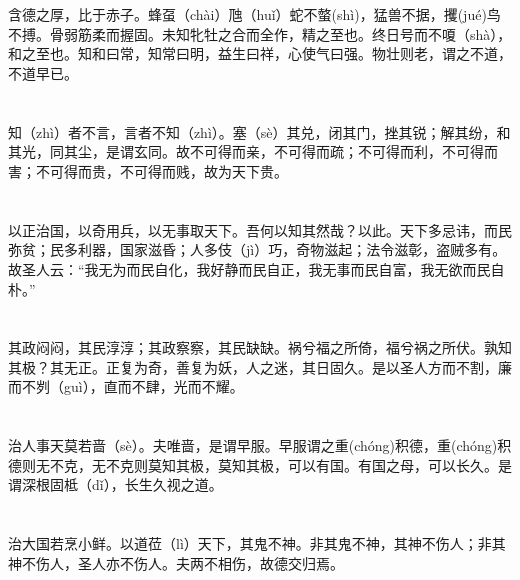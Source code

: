 \documentclass[a4paper,12pt,UTF8,twoside]{ctexbook}
\begin{document}
	\chapter{}	
	
	含德之厚，比于赤子。蜂虿（chài）虺（huǐ）蛇不螫(shì)，猛兽不据，攫(jué)鸟不搏。骨弱筋柔而握固。未知牝牡之合而全作，精之至也。终日号而不嗄（shà），和之至也。知和曰常，知常曰明，益生曰祥，心使气曰强。物壮则老，谓之不道，不道早已。 
	
	\chapter{}	
	
	知（zhì）者不言，言者不知（zhì）。塞（sè）其兑，闭其门，挫其锐；解其纷，和其光，同其尘，是谓玄同。故不可得而亲，不可得而疏；不可得而利，不可得而害；不可得而贵，不可得而贱，故为天下贵。
	
	\chapter{}	
	
	以正治国，以奇用兵，以无事取天下。吾何以知其然哉？以此。天下多忌讳，而民弥贫；民多利器，国家滋昏；人多伎（jì）巧，奇物滋起；法令滋彰，盗贼多有。故圣人云：“我无为而民自化，我好静而民自正，我无事而民自富，我无欲而民自朴。”
	
	\chapter{}	
	
	其政闷闷，其民淳淳；其政察察，其民缺缺。祸兮福之所倚，福兮祸之所伏。孰知其极？其无正。正复为奇，善复为妖，人之迷，其日固久。是以圣人方而不割，廉而不刿（guì），直而不肆，光而不耀。
	
	\chapter{}	
	
	治人事天莫若啬（sè）。夫唯啬，是谓早服。早服谓之重(chóng)积德，重(chóng)积德则无不克，无不克则莫知其极，莫知其极，可以有国。有国之母，可以长久。是谓深根固柢（dǐ），长生久视之道。
	
	\chapter{}	
	
	治大国若烹小鲜。以道莅（lì）天下，其鬼不神。非其鬼不神，其神不伤人；非其神不伤人，圣人亦不伤人。夫两不相伤，故德交归焉。
	
\end{document}
